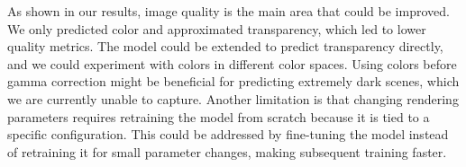 As shown in our results, image quality is the main area that could be improved.
We only predicted color and approximated transparency, which led to lower quality
metrics. The model could be extended to predict transparency directly, and we
could experiment with colors in different color spaces. Using colors before gamma
correction might be beneficial for predicting extremely dark scenes, which we
are currently unable to capture. Another limitation is that changing rendering
parameters requires retraining the model from scratch because it is tied to a
specific configuration. This could be addressed by fine-tuning the model instead
of retraining it for small parameter changes, making subsequent training faster.
